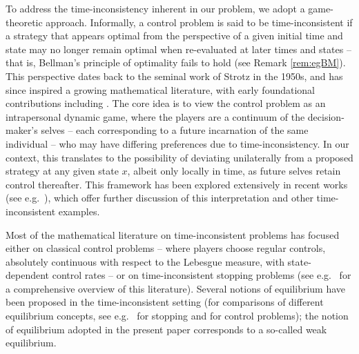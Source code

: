 \documentclass[11pt]{article} %
\numberwithin{komcounter}{section}
\begin{document}
 

To address the time-inconsistency inherent in our problem, we adopt a game-theoretic approach.
Informally, a control problem is said to be time-inconsistent if a strategy that appears optimal from the perspective of a given initial time and state may no longer remain optimal when re-evaluated at later times and states -- that is, Bellman’s principle of optimality fails to hold (see Remark \ref{rem:egBM}).
This perspective dates back to the seminal work of Strotz \cite{strotz} in the 1950s, and has since inspired a growing mathematical literature, with early foundational contributions including \cite{tomas-continpubl,bjork2014theory}.
The core idea is to view the control problem as an intrapersonal dynamic game, where the players are a  continuum of the decision-maker's selves -- each corresponding to a future incarnation of the same individual -- who may have differing preferences due to time-inconsistency.
In our context, this translates to the possibility of deviating unilaterally from a proposed strategy at any given %
state $x$, albeit only locally in time, as future selves retain control thereafter.
This framework has been explored extensively in recent works (see e.g.~\cite{tomas-continpubl,christensen2018finding, christensen2020time,lindensjo2019regular}), which offer further discussion of this interpretation and other time-inconsistent examples.

 

Most of the mathematical literature on time-inconsistent problems has focused either on classical control problems -- where players choose regular controls, absolutely continuous with respect to the Lebesgue measure, with state-dependent control rates 
-- or on time-inconsistent stopping problems (see e.g.~\cite{bjork2021time} for a comprehensive overview of this literature).
Several notions of equilibrium have been proposed in the time-inconsistent setting (for comparisons of different equilibrium concepts, see e.g.~\cite{bayraktar2023equilibria} for stopping and \cite{HuangZhou2020} for control problems); the notion of equilibrium adopted in the present paper corresponds to a so-called weak equilibrium.
\end{document}
